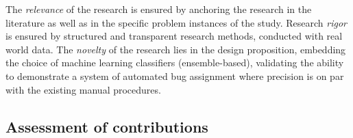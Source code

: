 \documentclass[graybox]{svmult}
\newcommand{\per}[1]{\textcolor{cyan}{{\it [Per says: #1]}}}
\newcommand{\per}[1]{}
\begin{document}
The \emph{relevance} of the research is ensured by anchoring the research in the literature as well as in the specific problem instances of the study. Research \emph{rigor} is ensured by structured and transparent research methods, conducted with real world data. The \emph{novelty} of the research lies in the design proposition, embedding the choice of machine learning classifiers (ensemble-based), validating the ability to demonstrate a system of automated bug assignment where precision is on par with the existing manual procedures.

%
%



\subsection{Assessment of contributions}
\label{sec:assessment}
\end{document}
